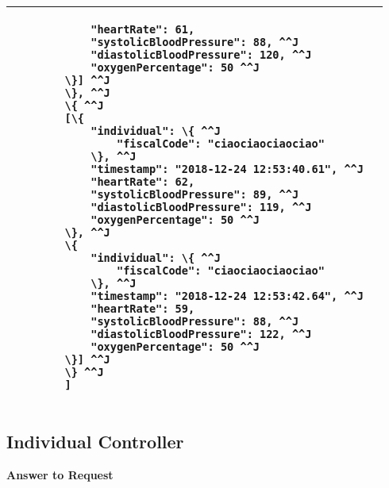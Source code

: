 \begin{tabularx}{\linewidth}{| l| l }
{\begin{lstlisting}
			"heartRate": 61,
			"systolicBloodPressure": 88, ^^J
			"diastolicBloodPressure": 120, ^^J
			"oxygenPercentage": 50 ^^J
		\}] ^^J
		\}, ^^J
		\{ ^^J
		[\{
			"individual": \{ ^^J
				"fiscalCode": "ciaociaociaociao"
			\}, ^^J
			"timestamp": "2018-12-24 12:53:40.61", ^^J
			"heartRate": 62,
			"systolicBloodPressure": 89, ^^J
			"diastolicBloodPressure": 119, ^^J
			"oxygenPercentage": 50 ^^J
		\}, ^^J
		\{
			"individual": \{ ^^J
				"fiscalCode": "ciaociaociaociao"
			\}, ^^J
			"timestamp": "2018-12-24 12:53:42.64", ^^J
			"heartRate": 59,
			"systolicBloodPressure": 88, ^^J
			"diastolicBloodPressure": 122, ^^J
			"oxygenPercentage": 50 ^^J
		\}] ^^J
		\} ^^J
		]
	\end{lstlisting}
	} \\
	\hline
	\end{tabularx}
\newpage
\subsection{Individual Controller}

	\textbf{Answer to Request} \\

